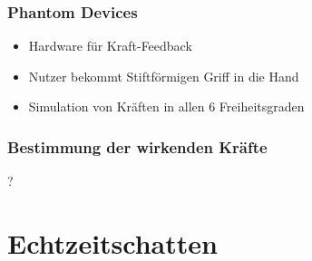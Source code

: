 \documentclass[a4paper, 12pt]{article}
\begin{document}
\subsubsection*{Phantom Devices}
\begin{itemize}
  \item Hardware für Kraft-Feedback
  \item Nutzer bekommt Stiftförmigen Griff in die Hand
  \item Simulation von Kräften in allen 6 Freiheitsgraden
\end{itemize}

\subsubsection*{Bestimmung der wirkenden Kräfte}
?



\section{Echtzeitschatten}
\end{document}
